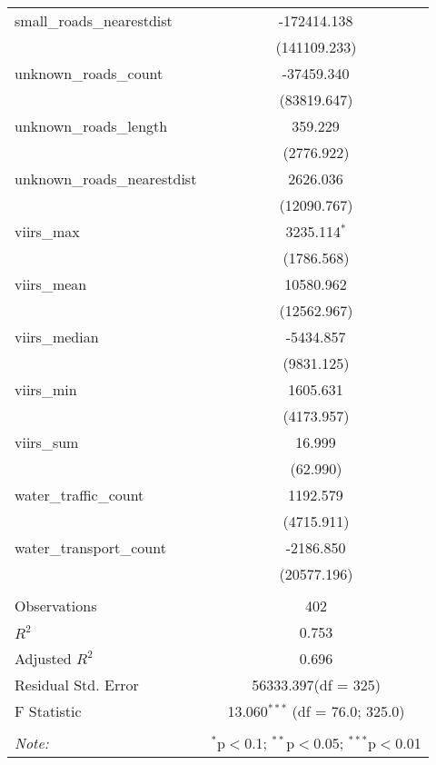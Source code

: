 \begin{table}[!htbp]
\begin{tabular}{@{\extracolsep{5pt}}lc}
 small_roads_nearestdist & -172414.138$^{}$ \\
  & (141109.233) \\
 unknown_roads_count & -37459.340$^{}$ \\
  & (83819.647) \\
 unknown_roads_length & 359.229$^{}$ \\
  & (2776.922) \\
 unknown_roads_nearestdist & 2626.036$^{}$ \\
  & (12090.767) \\
 viirs_max & 3235.114$^{*}$ \\
  & (1786.568) \\
 viirs_mean & 10580.962$^{}$ \\
  & (12562.967) \\
 viirs_median & -5434.857$^{}$ \\
  & (9831.125) \\
 viirs_min & 1605.631$^{}$ \\
  & (4173.957) \\
 viirs_sum & 16.999$^{}$ \\
  & (62.990) \\
 water_traffic_count & 1192.579$^{}$ \\
  & (4715.911) \\
 water_transport_count & -2186.850$^{}$ \\
  & (20577.196) \\
\hline \\[-1.8ex]
 Observations & 402 \\
 $R^2$ & 0.753 \\
 Adjusted $R^2$ & 0.696 \\
 Residual Std. Error & 56333.397(df = 325)  \\
 F Statistic & 13.060$^{***}$ (df = 76.0; 325.0) \\
\hline
\hline \\[-1.8ex]
\textit{Note:} & \multicolumn{1}{r}{$^{*}$p$<$0.1; $^{**}$p$<$0.05; $^{***}$p$<$0.01} \\
\end{tabular}
\end{table}